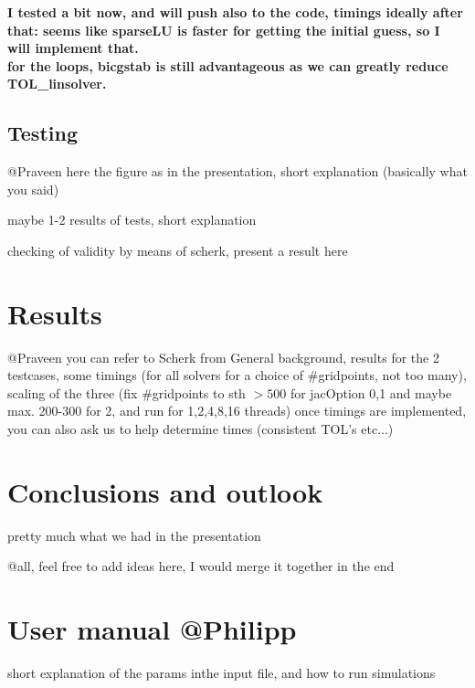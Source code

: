 \documentclass[11pt]{scrartcl}
\begin{document}
	\textbf{I tested a bit now, and will push also to the code, timings ideally after that:
	seems like sparseLU is faster for getting the initial guess, so I will implement that.\\
	for the loops, bicgstab is still advantageous as we can greatly reduce TOL\_linsolver.}
\normal
\subsection{Testing}
@Praveen
here the figure as in the presentation, short explanation (basically what you said)

maybe 1-2 results of tests, short explanation

checking of validity by means of scherk, present a result here

\section{Results}
@Praveen you can refer to Scherk from General background, 
results for the 2 testcases, some timings (for all solvers for a choice of $\#$gridpoints, not too many), scaling of the three (fix $\#$gridpoints to sth $>500$ for jacOption 0,1 and maybe max. 200-300 for 2, and run for 1,2,4,8,16 threads)
once timings are implemented, you can also ask us to help determine times (consistent TOL's etc...)


\section{Conclusions and outlook}
pretty much what we had in the presentation

@all, feel free to add ideas here, I would merge it together in the end


%


\appendix
\section{User manual @Philipp}
short explanation of the params inthe input file, and how to run simulations
\end{document}
